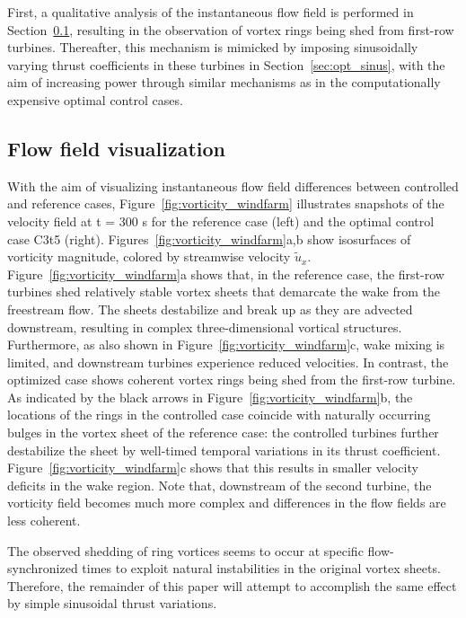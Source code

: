 \documentclass[wes, manuscript]{copernicus}
\begin{document}
First, a qualitative analysis of the instantaneous flow field is performed in Section~\ref{sec:opt_visualization}, resulting in the observation of vortex rings being shed from first-row turbines. Thereafter, this mechanism is mimicked by imposing sinusoidally varying thrust coefficients in these turbines in Section~\ref{sec:opt_sinus}, with the aim of increasing power through similar mechanisms as in the computationally expensive optimal control cases.

\subsection{Flow field visualization}\label{sec:opt_visualization}
With the aim of visualizing instantaneous flow field differences between controlled and reference cases, Figure~\ref{fig:vorticity_windfarm} illustrates snapshots of the velocity field at t = 300 s for the reference case (left) and the optimal control case C3t5 (right). Figures~\ref{fig:vorticity_windfarm}a,b show isosurfaces of vorticity magnitude, colored by streamwise velocity $\widetilde{u}_x$. Figure~\ref{fig:vorticity_windfarm}a shows that, in the reference case, the first-row turbines shed relatively stable vortex sheets that demarcate the wake from the freestream flow. The sheets destabilize and break up as they are advected downstream, resulting in complex three-dimensional vortical structures. Furthermore, as also shown in Figure~\ref{fig:vorticity_windfarm}c, wake mixing is limited, and downstream turbines experience reduced velocities. In contrast, the optimized case shows coherent vortex rings being shed from the first-row turbine. As indicated by the black arrows in Figure~\ref{fig:vorticity_windfarm}b, the locations of the rings in the controlled case coincide with naturally occurring bulges in the vortex sheet of the reference case: the controlled turbines further destabilize the sheet by well-timed temporal variations in its thrust coefficient. Figure~\ref{fig:vorticity_windfarm}c shows that this results in smaller velocity deficits in the wake region. Note that, downstream of the second turbine, the vorticity field becomes much more complex and differences in the flow fields are less coherent. 

The observed shedding of ring vortices seems to occur at specific flow-synchronized times to exploit natural instabilities in the original vortex sheets. Therefore, the remainder of this paper will attempt to accomplish the same effect by simple sinusoidal thrust variations. 
\end{document}
